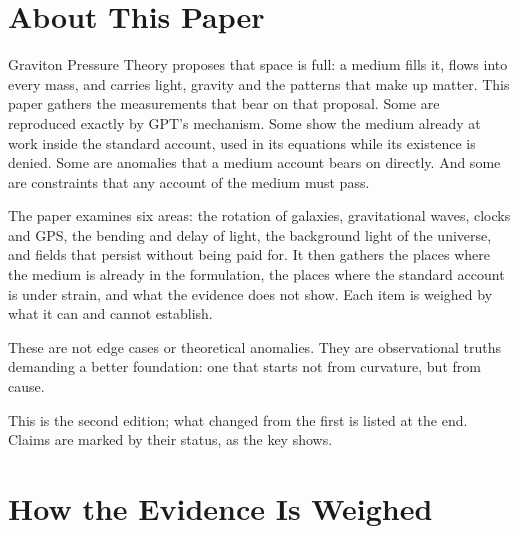 \newcommand{\gptpart}{9}
\newcommand{\gpttitle}{Existing Evidence Supporting Graviton Pressure Theory}
\newcommand{\gptsubtitle}{}
\newcommand{\gptdate}{November 2026}

\graphicspath{{figs/}}

\gptitle

\section*{About This Paper}

Graviton Pressure Theory proposes that space is full: a medium fills it, flows into every mass, and carries light, gravity and the patterns that make up matter. This paper gathers the measurements that bear on that proposal. Some are reproduced exactly by GPT's mechanism. Some show the medium already at work inside the standard account, used in its equations while its existence is denied. Some are anomalies that a medium account bears on directly. And some are constraints that any account of the medium must pass.

The paper examines six areas: the rotation of galaxies, gravitational waves, clocks and GPS, the bending and delay of light, the background light of the universe, and fields that persist without being paid for. It then gathers the places where the medium is already in the formulation, the places where the standard account is under strain, and what the evidence does not show. Each item is weighed by what it can and cannot establish.

These are not edge cases or theoretical anomalies. They are observational truths demanding a better foundation: one that starts not from curvature, but from cause.

This is the second edition; what changed from the first is listed at the end. Claims are marked by their status, as the key shows.

\statuskey

\section{How the Evidence Is Weighed}

